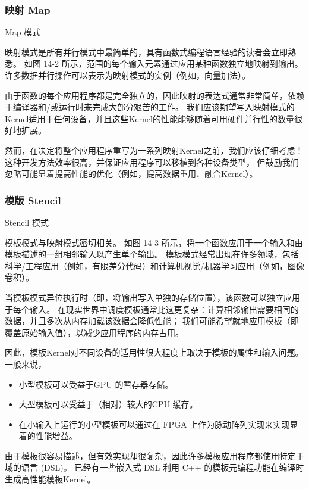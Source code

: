 \subsubsection{映射 Map}
{\color{red} Map 模式}

映射模式是所有并行模式中最简单的，具有函数式编程语言经验的读者会立即熟悉。 
如图 14-2 所示，范围的每个输入元素通过应用某种函数独立地映射到输出。 
许多数据并行操作可以表示为映射模式的实例（例如，向量加法）。

由于函数的每个应用程序都是完全独立的，因此映射的表达式通常非常简单，依赖于编译器和/或运行时来完成大部分艰苦的工作。 
我们应该期望写入映射模式的Kernel适用于任何设备，并且这些Kernel的性能能够随着可用硬件并行性的数量很好地扩展。

然而，在决定将整个应用程序重写为一系列映射Kernel之前，我们应该仔细考虑！ 
这种开发方法效率很高，并保证应用程序可以移植到各种设备类型，
但鼓励我们忽略可能显着提高性能的优化（例如，提高数据重用、融合Kernel）。

\subsubsection{模版 Stencil}
{\color{red} Stencil 模式}

模板模式与映射模式密切相关。 如图 14-3 所示，将一个函数应用于一个输入和由模板描述的一组相邻输入以产生单个输出。 
模板模式经常出现在许多领域，包括科学/工程应用（例如，有限差分代码）和计算机视觉/机器学习应用（例如，图像卷积）。

当模板模式异位执行时（即，将输出写入单独的存储位置），该函数可以独立应用于每个输入。 
在现实世界中调度模板通常比这更复杂：计算相邻输出需要相同的数据，并且多次从内存加载该数据会降低性能； 
我们可能希望就地应用模板（即覆盖原始输入值），以减少应用程序的内存占用。

因此，模板Kernel对不同设备的适用性很大程度上取决于模板的属性和输入问题。 一般来说，

\begin{itemize}
	\item 小型模板可以受益于GPU 的暂存器存储。

	\item 大型模板可以受益于（相对）较大的CPU 缓存。

	\item 在小输入上运行的小型模板可以通过在 FPGA 上作为脉动阵列实现来实现显着的性能增益。
\end{itemize}

由于模板很容易描述，但有效实现却很复杂，因此许多模板应用程序都使用特定于域的语言 (DSL)。 
已经有一些嵌入式 DSL 利用 C++ 的模板元编程功能在编译时生成高性能模板Kernel。

